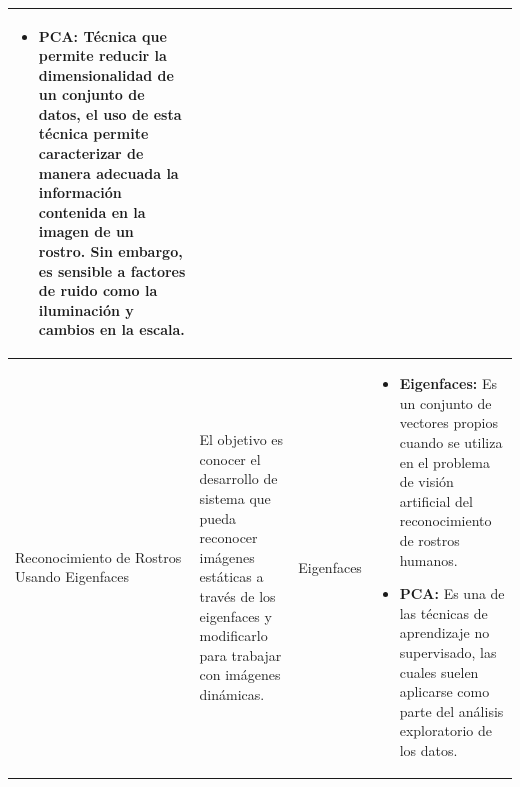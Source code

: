 \begin{longtable}{|m{3cm}|m{2.5cm}|m{2.5cm}|m{8.5cm}|}
	\begin{itemize}
		
		\item \textbf{PCA:}  Técnica que permite reducir la dimensionalidad de un conjunto de datos, el uso de esta técnica permite caracterizar de manera adecuada la información contenida en la imagen de un rostro. Sin embargo, es sensible a factores de ruido como la iluminación y cambios en la escala.
	\end{itemize} \\
	
	\hline Reconocimiento de Rostros Usando Eigenfaces &  El objetivo es conocer el desarrollo de sistema que pueda reconocer imágenes estáticas a través de los eigenfaces y modificarlo para trabajar con imágenes dinámicas. & Eigenfaces &
	
	\begin{itemize}
		
		\item \textbf{Eigenfaces:}  Es un conjunto de vectores propios cuando se utiliza en el problema de visión artificial del reconocimiento de rostros humanos.
		
		\item \textbf{PCA:} Es una de las técnicas de aprendizaje no supervisado, las cuales suelen aplicarse como parte del análisis exploratorio de los datos. 
		
	\end{itemize} \\
	
	\hline
\end{longtable}